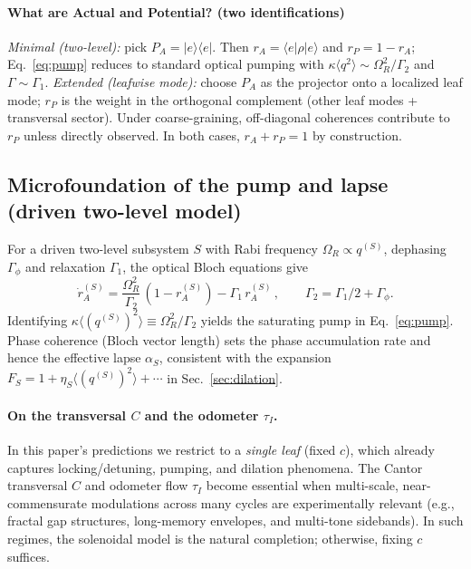 \documentclass[11pt]{article}
\begin{document}
\paragraph{What are Actual and Potential? (two identifications)}
\emph{Minimal (two-level):} pick $P_A=|e\rangle\langle e|$. Then $r_A=\langle e|\rho|e\rangle$ and $r_P=1-r_A$; Eq.~\eqref{eq:pump} reduces to standard optical pumping with $\kappa\langle q^2\rangle\sim \Omega_R^2/\Gamma_2$ and $\Gamma\sim \Gamma_1$.
\emph{Extended (leafwise mode):} choose $P_A$ as the projector onto a localized leaf mode; $r_P$ is the weight in the orthogonal complement (other leaf modes + transversal sector). Under coarse-graining, off-diagonal coherences contribute to $r_P$ unless directly observed. In both cases, $r_A+r_P=1$ by construction.


\subsection*{Microfoundation of the pump and lapse (driven two-level model)}
For a driven two-level subsystem $S$ with Rabi frequency $\Omega_R\propto q^{(S)}$, dephasing $\Gamma_\phi$ and relaxation $\Gamma_1$, the optical Bloch equations give
\begin{equation}
\dot r_A^{(S)} = \frac{\Omega_R^2}{\Gamma_2}\,(1-r_A^{(S)}) - \Gamma_1\, r_A^{(S)}\,,\qquad \Gamma_2=\Gamma_1/2+\Gamma_\phi.
\end{equation}
Identifying $\kappa\langle (q^{(S)})^2\rangle \equiv \Omega_R^2/\Gamma_2$ yields the saturating pump in Eq.~\eqref{eq:pump}.
Phase coherence (Bloch vector length) sets the phase accumulation rate and hence the effective lapse $\alpha_S$, consistent with the expansion $F_S=1+\eta_S\langle (q^{(S)})^2\rangle+\cdots$ in Sec.~\ref{sec:dilation}.

\paragraph{On the transversal $C$ and the odometer $\tau_I$.}
In this paper’s predictions we restrict to a \emph{single leaf} (fixed $c$), which already captures locking/detuning, pumping, and dilation phenomena. The Cantor transversal $C$ and odometer flow $\tau_I$ become essential when multi-scale, near-commensurate modulations across many cycles are experimentally relevant (e.g., fractal gap structures, long-memory envelopes, and multi-tone sidebands). In such regimes, the solenoidal model is the natural completion; otherwise, fixing $c$ suffices.
\end{document}
